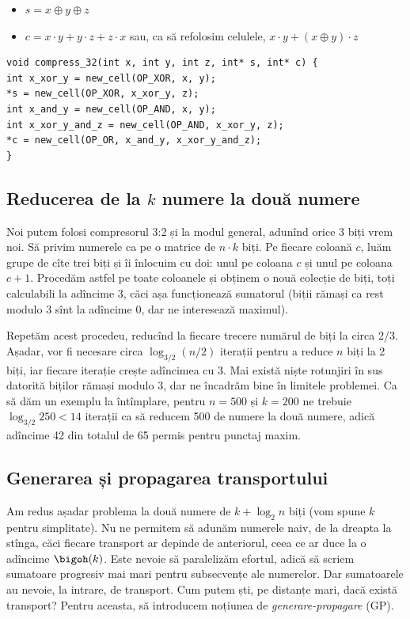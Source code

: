 \begin{itemize}
  \item $s = x \oplus y \oplus z$
  \item $c = x \cdot y + y \cdot z + z \cdot x$ sau, ca să refolosim celulele, $x \cdot y + (x \oplus y) \cdot z$
\end{itemize}

\begin{verbatim}
void compress_32(int x, int y, int z, int* s, int* c) {
int x_xor_y = new_cell(OP_XOR, x, y);
*s = new_cell(OP_XOR, x_xor_y, z);
int x_and_y = new_cell(OP_AND, x, y);
int x_xor_y_and_z = new_cell(OP_AND, x_xor_y, z);
*c = new_cell(OP_OR, x_and_y, x_xor_y_and_z);
}
\end{verbatim}

\subsection{Reducerea de la \texorpdfstring{$k$}{k} numere la două numere}

Noi putem folosi compresorul 3:2 și la modul general, adunînd orice 3 biți vrem noi. Să privim numerele ca pe o matrice de $n \cdot k$ biți. Pe fiecare coloană $c$, luăm grupe de cîte trei biți și îi înlocuim cu doi: unul pe coloana $c$ și unul pe coloana $c + 1$. Procedăm astfel pe toate coloanele și obținem o nouă colecție de biți, toți calculabili la adîncime 3, căci așa funcționează sumatorul (biții rămași ca rest modulo 3 sînt la adîncime 0, dar ne interesează maximul).

Repetăm acest procedeu, reducînd la fiecare trecere numărul de biți la circa 2/3. Așadar, vor fi necesare circa $\log_{3/2}(n/2)$ iterații pentru a reduce $n$ biți la 2 biți, iar fiecare iterație crește adîncimea cu 3. Mai există niște rotunjiri în sus datorită biților rămași modulo 3, dar ne încadrăm bine în limitele problemei. Ca să dăm un exemplu la întîmplare, pentru $n = 500$ și $k = 200$ ne trebuie $\log_{3/2} 250 < 14$ iterații ca să reducem 500 de numere la două numere, adică adîncime 42 din totalul de 65 permis pentru punctaj maxim.

\subsection{Generarea și propagarea transportului}

Am redus așadar problema la două numere de $k + \log_2 n$ biți (vom spune $k$ pentru simplitate). Nu ne permitem să adunăm numerele naiv, de la dreapta la stînga, căci fiecare transport ar depinde de anteriorul, ceea ce ar duce la o adîncime $\bigoh(k)$. Este nevoie să paralelizăm efortul, adică să scriem sumatoare progresiv mai mari pentru subsecvențe ale numerelor. Dar sumatoarele au nevoie, la intrare, de transport. Cum putem ști, pe distanțe mari, dacă există transport? Pentru aceasta, să introducem noțiunea de \textit{generare-propagare} (GP).

